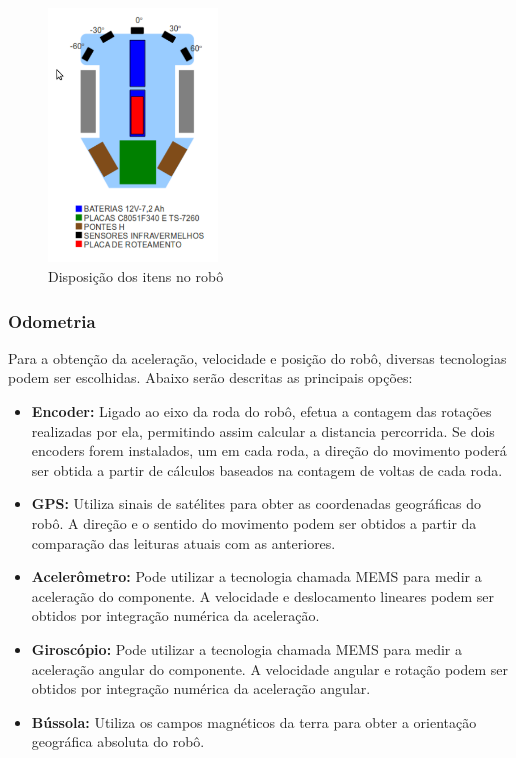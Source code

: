 \begin{figure}[H]
\centering
\includegraphics[width=0.4\textwidth]{./figuras/disposicao-robo.png}
\caption{Disposição dos itens no robô}
\label{fig:disposicao_bellator_2012}
\end{figure}

\subsubsection{Odometria}

Para a obtenção da aceleração, velocidade e posição do robô, diversas tecnologias podem ser escolhidas. Abaixo serão descritas as principais opções:

\begin{itemize}
  \item \textbf{Encoder:} Ligado ao eixo da roda do robô, efetua a contagem das rotações realizadas por ela, permitindo assim calcular a distancia percorrida. Se dois encoders forem instalados, um em cada roda, a direção do movimento poderá ser obtida a partir de cálculos baseados na contagem de voltas de cada roda.
  \item \textbf{GPS:} Utiliza sinais de satélites para obter as coordenadas geográficas do robô. A direção e o sentido do movimento podem ser obtidos a partir da comparação das leituras atuais com as anteriores.
  \item 	\textbf{Acelerômetro:} Pode utilizar a tecnologia chamada MEMS para medir a aceleração do componente. A velocidade e deslocamento lineares podem ser obtidos por integração numérica da aceleração.
  \item 	\textbf{Giroscópio:} Pode utilizar a tecnologia chamada MEMS para medir a aceleração angular do componente. A velocidade angular e rotação podem ser obtidos por integração numérica da aceleração angular.
  \item 	\textbf{Bússola:} Utiliza os campos magnéticos da terra para obter a orientação geográfica absoluta do robô.
\end{itemize}

